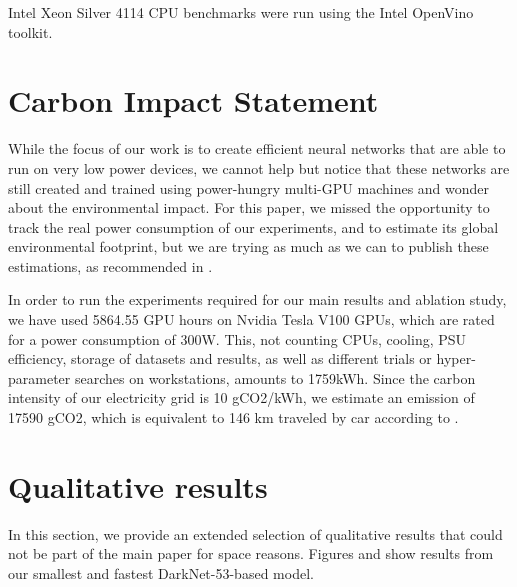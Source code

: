 \documentclass[10pt,twocolumn]{article}
\begin{document}
Intel Xeon Silver 4114 CPU benchmarks were run using
the Intel OpenVino toolkit.

\section{Carbon Impact Statement}

While the focus of our work is to create efficient neural
networks that are able to run on very low power devices, we
cannot help but notice that these networks are still created
and trained using power-hungry multi-GPU machines and
wonder about the environmental impact. For this paper, we
missed the opportunity to track the real power consumption
of our experiments, and to estimate its global environmental
footprint, but we are trying as much as we can to publish
these estimations, as recommended in \cite{anthony2020carbontracker,henderson2020towards,lannelongue2020green}.

In order to run the experiments required for our main results
and ablation study, we have used 5864.55 GPU hours
on Nvidia Tesla V100 GPUs, which are rated for a power
consumption of 300W. This, not counting CPUs, cooling,
PSU efficiency, storage of datasets and results, as well as
different trials or hyper-parameter searches on workstations,
amounts to 1759kWh. Since the carbon intensity of our
electricity grid is 10 gCO2/kWh, we estimate an emission
of 17590 gCO2, which is equivalent to 146 km traveled by
car according to \cite{anthony2020carbontracker}.

\section{Qualitative results}

In this section, we provide an extended selection of qualitative
results that could not be part of the main paper for
space reasons. Figures  and  show results from our smallest
and fastest DarkNet-53-based model.

\newpage

{\small


}
\end{document}
